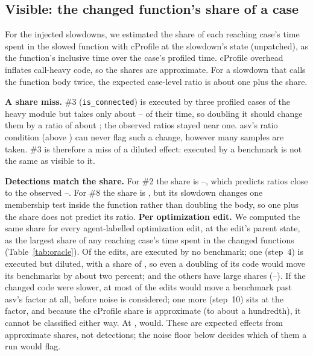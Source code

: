 
\subsection{Visible: the changed function's share of a case}
\label{sec:share}

For the injected slowdowns, we estimated the share of each reaching case's time spent in the slowed function with cProfile at the slowdown's state (unpatched), as the function's inclusive time over the case's profiled time.
cProfile overhead inflates call-heavy code, so the shares are approximate.
For a slowdown that calls the function body twice, the expected case-level ratio is about one plus the share.

\textbf{A share miss.} \#3 (\texttt{is\_connected}) is executed by three profiled cases of the heavy module but takes only about \ShareThreeLo--\ShareThreeHi{} of their time, so doubling it should change them by a ratio of about \ExpThree; the observed ratios stayed near one.
asv's ratio condition (above \AsvFactor) can never flag such a change, however many samples are taken.
\#3 is therefore a miss of a diluted effect: executed by a benchmark is not the same as visible to it.

\textbf{Detections match the share.} For \#2 the share is \ShareTwoLo--\ShareTwoHi, which predicts ratios close to the observed \SlowTwoRatioLo--\SlowTwoRatioHi.
For \#8 the share is \ShareEight, but its slowdown changes one membership test inside the function rather than doubling the body, so one plus the share does not predict its ratio.
\textbf{Per optimization edit.} We computed the same share for every agent-labelled optimization edit, at the edit's parent state, as the largest share of any reaching case's time spent in the changed functions (Table~\ref{tab:oracle}).
Of the \NxAgentOpt{} edits, \BOneAgentUnreached{} are executed by no benchmark; one (step~4) is executed but diluted, with a share of \EditShareDiluted, so even a doubling of its code would move its benchmarks by about two percent; and the others have large shares (\EditShareBigLo--\EditShareBigHi).
If the changed code were \PowFactorMid\x{} slower, at most \EditsClearMid{} of the \NxAgentOpt{} edits would move a benchmark past asv's factor at all, before noise is considered; one more (step~10) sits at the factor, and because the cProfile share is approximate (to about a hundredth), it cannot be classified either way. At \PowFactorHigh\x, \EditsClearHigh{} would.
These are expected effects from approximate shares, not detections; the noise floor below decides which of them a run would flag.

